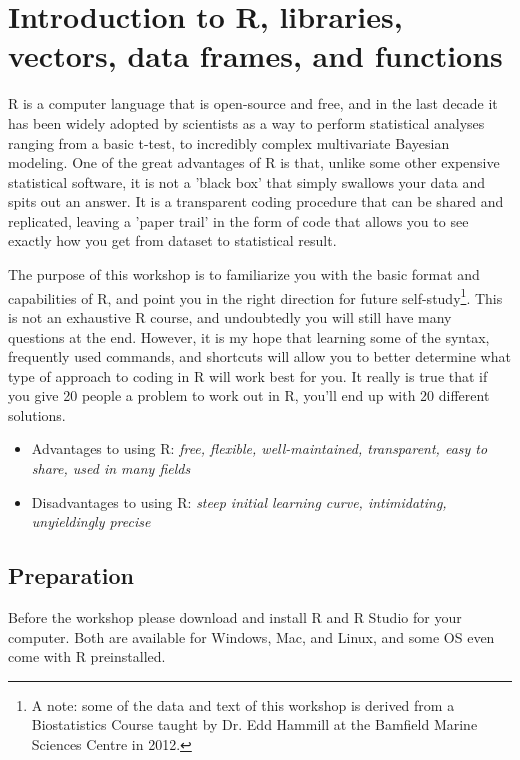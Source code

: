 \documentclass{article}
\begin{document}


\section{Introduction to R, libraries, vectors, data frames, and functions}

  R is a computer language that is open-source and free, and in the last decade it has been widely adopted by scientists as a way to perform statistical analyses ranging from a basic t-test, to incredibly complex multivariate Bayesian modeling. One of the great advantages of R is that, unlike some other expensive statistical software, it is not a 'black box' that simply swallows your data and spits out an answer. It is a transparent coding procedure that can be shared and replicated, leaving a 'paper trail' in the form of code that allows you to see exactly how you get from dataset to statistical result. 

  The purpose of this workshop is to familiarize you with the basic format and capabilities of R, and point you in the right direction for future self-study\footnote{A note: some of the data and text of this workshop is derived from a Biostatistics Course taught by Dr. Edd Hammill at the Bamfield Marine Sciences Centre in 2012.}. This is not an exhaustive R course, and undoubtedly you will still have many questions at the end. However, it is my hope that learning some of the syntax, frequently used commands, and shortcuts will allow you to better determine what type of approach to coding in R will work best for you. It really is true that if you give 20 people a problem to work out in R, you'll end up with 20 different solutions. 

\begin{itemize}
\item Advantages to using R: \textit{free, flexible, well-maintained, transparent, easy to share, used in many fields}
\item Disadvantages to using R: \textit{steep initial learning curve, intimidating, unyieldingly precise}
\end{itemize}

\subsection{Preparation}

  Before the workshop please download and install R and R Studio for your computer. Both are available for Windows, Mac, and Linux, and some OS even come with R preinstalled. 
  
\end{document}
